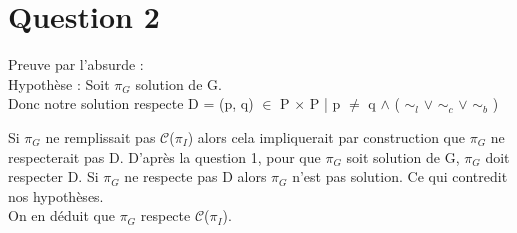 
\section{Question 2}

Preuve par l'absurde :\\
Hypoth\`ese : Soit $\pi_G$ solution de G.\\
Donc notre solution respecte D = {(p, q) $\in$ P $\times$ P | p $\neq$ q $\wedge$ ( $\sim_{l}$ $\vee$ $\sim_{c}$ $\vee$ $\sim_{b}$ )}

Si $\pi_G$ ne remplissait pas $\mathcal{C}$($\pi_I$) alors cela impliquerait par construction que $\pi_G$ ne respecterait pas D. D'apr\`es la question 1, pour que $\pi_G$ soit solution de G, $\pi_G$ doit respecter D. Si $\pi_G$ ne respecte pas D alors $\pi_G$ n'est pas solution. Ce qui contredit nos hypoth\`eses.\\
On en d\'eduit que $\pi_G$ respecte $\mathcal{C}$($\pi_I$).